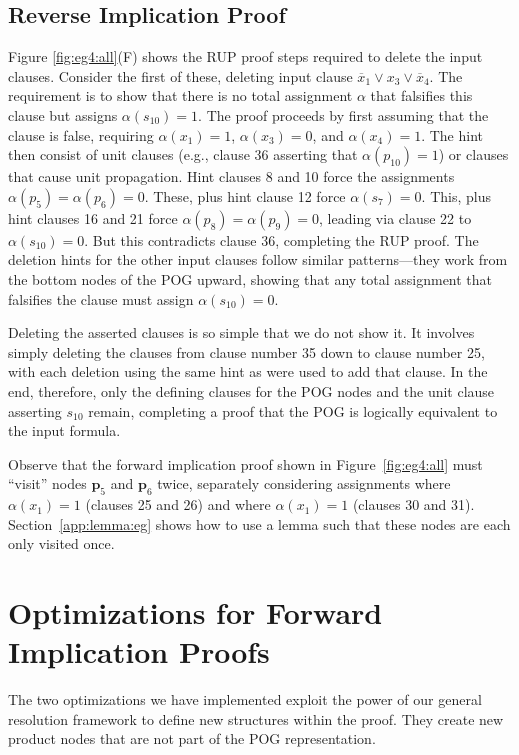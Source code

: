 \documentclass[letterpaper,USenglish,cleveref, autoref, thm-restate]{lipics-v2021}
\newcommand{\obar}[1]{\overline{#1}}
\newcommand{\assign}{\alpha}
\newcommand{\makenode}[1]{\mathbf{#1}}
\newcommand{\nodep}{\makenode{p}}
\begin{document}
\subsection{Reverse Implication Proof}

Figure \ref{fig:eg4:all}(F) shows the RUP proof steps required to
delete the input clauses.  Consider the first of these, deleting
input clause $\obar{x}_1 \lor x_3 \lor \obar{x}_4$.  The requirement is to show
that there is no total assignment $\assign$ that falsifies this clause but assigns $\assign(s_{10}) = 1$.
The proof proceeds by first assuming that the clause is false, requiring
$\assign(x_1) = 1$, $\assign(x_3) = 0$, and $\assign(x_4) = 1$.  The hint then consist of unit
clauses (e.g., clause 36 asserting that $\alpha(p_{10}) = 1$) or
clauses that cause unit propagation.  Hint clauses 8 and 10 force the
assignments $\assign(p_5) = \assign(p_6) = 0$.  These, plus hint clause 12 force
$\assign(s_7) = 0$.  This, plus hint clauses 16 and 21 force $\assign(p_8) = \assign(p_9) = 0$, leading
via clause 22 to $\assign(s_{10}) = 0$.  But this contradicts clause 36,
completing the RUP proof.  The deletion hints for the other input
clauses follow similar patterns---they work from the bottom nodes of
the POG upward, showing that any total assignment that falsifies the clause
must assign $\assign(s_{10}) = 0$.

Deleting the asserted clauses is so simple that we do not show it.  It
involves simply deleting the clauses from clause number 35 down to
clause number 25, with each deletion using the same hint as were used
to add that clause.  In the end, therefore, only the defining clauses
for the POG nodes and the unit clause asserting $s_{10}$ remain,
completing a proof that the POG is logically equivalent to the input
formula.

Observe that the forward implication proof shown in Figure~\ref{fig:eg4:all}  must ``visit'' nodes
$\nodep_5$ and $\nodep_6$ twice, separately considering  assignments where $\assign(x_1) = 1$
(clauses 25 and 26) and where $\assign(x_1) = 1$ (clauses 30 and 31).
Section~\ref{app:lemma:eg} shows how to use a lemma such that these nodes are each only visited once.


\section{Optimizations for Forward Implication Proofs}

The two optimizations we have implemented exploit the power of our
general resolution framework to define new structures within the
proof.
They create new product nodes that are not part
of the POG representation.
\end{document}
